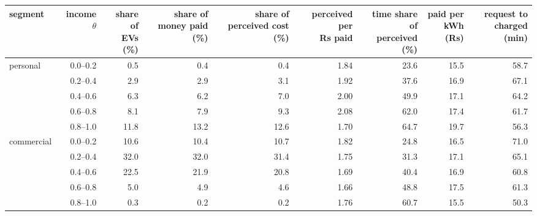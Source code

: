 \begin{tabular}{lrrrrrrrr}\toprule
segment & income $\theta$ & \shortstack{share of\\EVs (\%)} & \shortstack{share of\\money paid (\%)} & \shortstack{share of\\perceived cost (\%)} & \shortstack{perceived per\\Rs paid} & \shortstack{time share of\\perceived (\%)} & \shortstack{paid per\\kWh (Rs)} & \shortstack{request to\\charged (min)} \\ \midrule
personal & 0.0--0.2 & 0.5 & 0.4 & 0.4 & 1.84 & 23.6 & 15.5 & 58.7 \\
 & 0.2--0.4 & 2.9 & 2.9 & 3.1 & 1.92 & 37.6 & 16.9 & 67.1 \\
 & 0.4--0.6 & 6.3 & 6.2 & 7.0 & 2.00 & 49.9 & 17.1 & 64.2 \\
 & 0.6--0.8 & 8.1 & 7.9 & 9.3 & 2.08 & 62.0 & 17.4 & 61.7 \\
 & 0.8--1.0 & 11.8 & 13.2 & 12.6 & 1.70 & 64.7 & 19.7 & 56.3 \\
commercial & 0.0--0.2 & 10.6 & 10.4 & 10.7 & 1.82 & 24.8 & 16.5 & 71.0 \\
 & 0.2--0.4 & 32.0 & 32.0 & 31.4 & 1.75 & 31.3 & 17.1 & 65.1 \\
 & 0.4--0.6 & 22.5 & 21.9 & 20.8 & 1.69 & 40.4 & 16.9 & 60.8 \\
 & 0.6--0.8 & 5.0 & 4.9 & 4.6 & 1.66 & 48.8 & 17.5 & 61.3 \\
 & 0.8--1.0 & 0.3 & 0.2 & 0.2 & 1.76 & 60.7 & 15.5 & 50.3 \\
\bottomrule\end{tabular}
